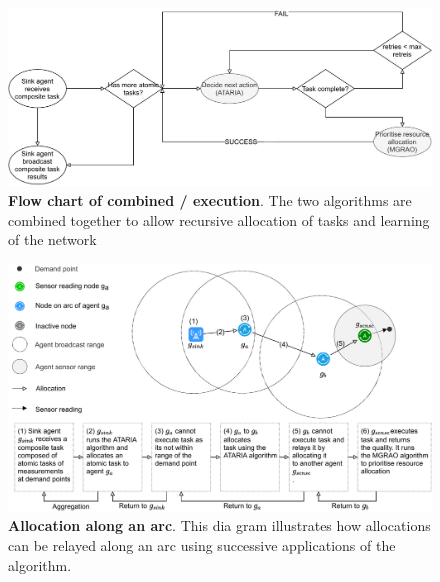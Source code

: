 
\begin{figure}
	\centering
	\includegraphics[width=0.9\linewidth]{algorithm-flow}
	\caption{\textbf{Flow chart of combined \acronymATARIA{}{}/\acronymMGRAO{}{} execution}. The two algorithms are combined together to allow recursive allocation of tasks and learning of the network}
	\label{fig:algorithm-flow}
\end{figure}
\begin{figure}
	\centering
	\includegraphics[width=0.9\linewidth]{arc-flow}
	\caption{\textbf{Allocation along an arc}. This dia gram illustrates how allocations can be relayed along an arc using successive applications of the \acronymATARIA{}{} algorithm.}
	\label{fig:arc-flow}
\end{figure}